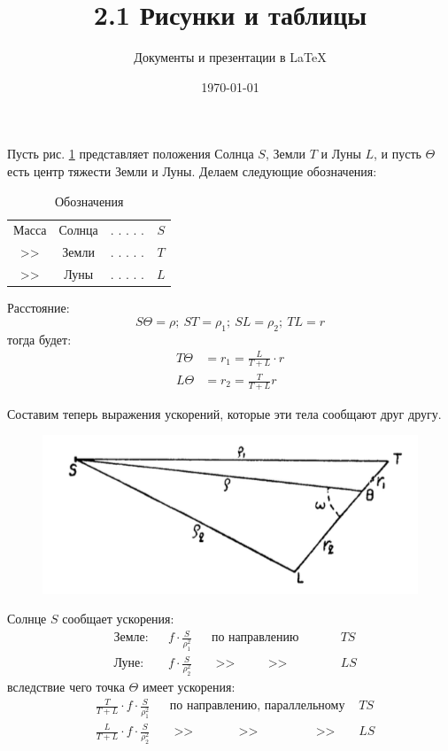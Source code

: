 \documentclass[a4paper,12pt]{article}
\author{Документы и презентации в \LaTeX}
\title{2.1 Рисунки и таблицы}
\date{\today}
\begin{document}
Пусть рис. \ref{fig:21} представляет положения Солнца $S$, Земли $T$ и Луны $L$, и пусть $\Theta$ есть центр тяжести Земли и Луны. Делаем следующие обозначения:

\begin{table}[h]
	\begin{center}
		\begin{tabular}{cccc}
    	Масса	& Солнца	& . . . . . &	$S$ \\ 
   		>>		& Земли		& . . . . . &	$T$ \\
   		>>		& Луны		& . . . . . &	$L$ \\
		\end{tabular}
	\end{center}
	\caption{Обозначения}
	\label{tab:designations}
\end{table}

Расстояние:
\[ S\Theta = \rho; ~ ST = \rho_1; ~ SL = \rho_2; ~ TL = r \]
тогда будет:
\begin{equation}
	\begin{aligned}
		T\Theta &= r_1 = \frac{L}{T + L} \cdot r \\
		L\Theta &= r_2 = \frac{T}{T + L} r
	\end{aligned}
	\label{eq:r1_r2}
\end{equation}

Составим теперь выражения ускорений, которые эти тела сообщают друг другу.

\begin{figure}[h]
	\begin{center}
		\includegraphics[scale = 1]{21.png}
		\caption{}
		\label{fig:21}
	\end{center}
\end{figure}

Солнце $S$ сообщает ускорения:
\[
	\begin{aligned}
		&\text{Земле:} & &f \cdot \frac{S}{\rho_1^2} & &\text{по направлению } &TS \\
		&\text{Луне:}  & &f \cdot \frac{S}{\rho_2^2} & &\text{ >> } \qquad \text{ >> } \qquad \quad \, &LS
	\end{aligned}
\]
вследствие чего точка $\Theta$ имеет ускорения:
\[
\begin{aligned}
	&\frac{T}{T + L} \cdot f \cdot \frac{S}{\rho_1^2} & &\text{по направлению, параллельному } &TS \\
	&\frac{L}{T + L} \cdot f \cdot \frac{S}{\rho_2^2} & &\text{ >> } \qquad \quad \text{ >> } \qquad \quad \quad \text{ >> }  &LS
\end{aligned}
\]
\end{document}

